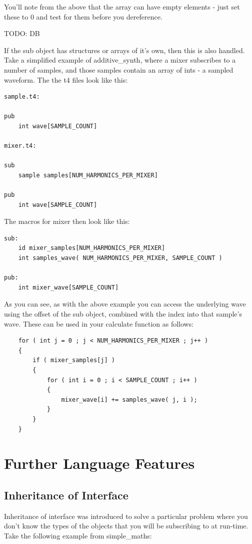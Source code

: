 \documentclass{report}
\begin{document}
You'll note from the above that the array can have empty elements - just set these to 0 and test for them before you dereference.

TODO: DB

If the sub object has structures or arrays of it's own, then this is also handled. Take a simplified example of additive_synth, where a mixer subscribes to a number of samples, and those samples contain an array of ints - a sampled waveform. The the t4 files look like this:


\begin{verbatim}
sample.t4:

pub
    int wave[SAMPLE_COUNT]

mixer.t4:

sub
    sample samples[NUM_HARMONICS_PER_MIXER]

pub
    int wave[SAMPLE_COUNT]
\end{verbatim}

The macros for mixer then look like this:

\begin{verbatim}
sub:
    id mixer_samples[NUM_HARMONICS_PER_MIXER]
    int samples_wave( NUM_HARMONICS_PER_MIXER, SAMPLE_COUNT )

pub:
    int mixer_wave[SAMPLE_COUNT]
\end{verbatim}

As you can see, as with the above example you can access the underlying wave using the offset of the sub object, combined with the index into that sample's wave. These can be used in your calculate function as follows:

\begin{verbatim}
    for ( int j = 0 ; j < NUM_HARMONICS_PER_MIXER ; j++ )
    {
        if ( mixer_samples[j] )
        {
            for ( int i = 0 ; i < SAMPLE_COUNT ; i++ )
            {
                mixer_wave[i] += samples_wave( j, i );
            }
        }
    }
\end{verbatim}

\chapter{Further Language Features}

\section{Inheritance of Interface}

Inheritance of interface was introduced to solve a particular problem where you don't know the types of the objects that you will be subscribing to at run-time. Take the following example from simple_maths:
\end{document}
